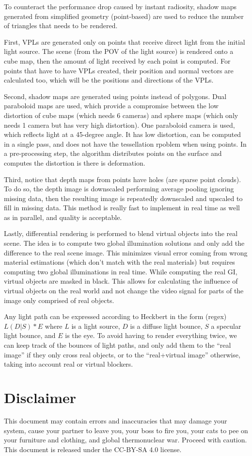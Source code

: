 \documentclass[a4paper]{article}
\begin{document}
To counteract the performance drop caused by instant radiosity, shadow maps generated from simplified geometry (point-based) are used to reduce the number of triangles that needs to be rendered.

First, VPLs are generated only on points that receive direct light from the initial light source. The scene (from the POV of the light source) is rendered onto a cube map, then the amount of light received by each point is computed.
For points that have to have VPLs created, their position and normal vectors are calculated too, which will be the positions and directions of the VPLs.

Second, shadow maps are generated using points instead of polygons. Dual paraboloid maps are used, which provide a compromise between the low distortion of cube maps (which needs 6 cameras) and sphere maps (which only needs 1 camera but has very high distortion).
One paraboloid camera is used, which reflects light at a 45-degree angle.
It has low distortion, can be computed in a single pass, and does not have the tessellation rpoblem when using points.
In a pre-processing step, the algorithm distributes points on the surface and computes the distortion is there is deformation.

Third, notice that depth maps from points have holes (are sparse point clouds).
To do so, the depth image is downscaled performing average pooling ignoring missing data, then the resulting image is repeatedly downscaled and upscaled to fill in missing data.
This method is really fast to implement in real time as well as in parallel, and quality is acceptable.

Lastly, differential rendering is performed to blend virtual objects into the real scene.
The idea is to compute two global illumination solutions and only add the difference to the real scene image.
This minimizes visual error coming from wrong material estimations (which don't match with the real materials) but requires computing two global illuminations in real time.
While computing the real GI, virtual objects are masked in black.
This allows for calculating the influence of virtual objects on the real world and not change the video signal for parts of the image only comprised of real objects.

Any light path can be expressed according to Heckbert in the form (regex) $L(D|S)*E$ where $L$ is a light source, $D$ is a diffuse light bounce, $S$ a specular light bounce, and $E$ is the eye.
To avoid having to render everything twice, we can keep track of the bounces of light paths, and only add them to the ``real image'' if they only cross real objects, or to the ``real+virtual image'' otherwise, taking into account real or virtual blockers. 

\section{Disclaimer}

This document may contain errors and inaccuracies that may damage your
system, cause your partner to leave you, your boss to fire you, your
cats to pee on your furniture and clothing, and global thermonuclear
war.
Proceed with caution.
This document is released under the CC-BY-SA 4.0 license.
\ccbysa
\end{document}
